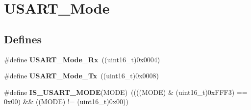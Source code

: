 \hypertarget{group__USART__Mode}{
\section{USART\_\-Mode}
\label{group__USART__Mode}
}
\subsection*{Defines}
\begin{DoxyCompactItemize}
\item 
\hypertarget{group__USART__Mode_gafefcc3d3c1a1f83b425784fa6289aecf}{
\#define {\bfseries USART\_\-Mode\_\-Rx}~((uint16\_\-t)0x0004)}
\label{group__USART__Mode_gafefcc3d3c1a1f83b425784fa6289aecf}

\item 
\hypertarget{group__USART__Mode_ga22b2813509a062435ea68d086ec565b4}{
\#define {\bfseries USART\_\-Mode\_\-Tx}~((uint16\_\-t)0x0008)}
\label{group__USART__Mode_ga22b2813509a062435ea68d086ec565b4}

\item 
\hypertarget{group__USART__Mode_gae9140e5ca405d2377fe0e82c79e136a2}{
\#define {\bfseries IS\_\-USART\_\-MODE}(MODE)~((((MODE) \& (uint16\_\-t)0xFFF3) == 0x00) \&\& ((MODE) != (uint16\_\-t)0x00))}
\label{group__USART__Mode_gae9140e5ca405d2377fe0e82c79e136a2}

\end{DoxyCompactItemize}
